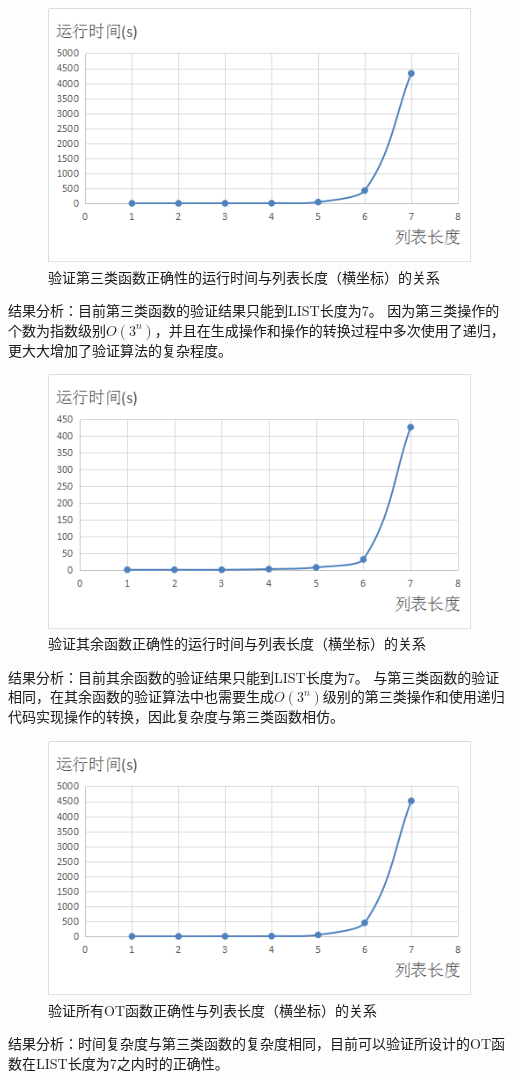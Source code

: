 \begin{figure}[H]
\centering
\includegraphics{figures/runtime3.bmp}
\caption{验证第三类函数正确性的运行时间与列表长度（横坐标）的关系}
\end{figure}
\par 结果分析：目前第三类函数的验证结果只能到LIST长度为7。
因为第三类操作的个数为指数级别$O(3^n)$，并且在生成操作和操作的转换过程中多次使用了递归，更大大增加了验证算法的复杂程度。

\begin{figure}[H]
\centering
\includegraphics{figures/runtime4.bmp}
\caption{验证其余函数正确性的运行时间与列表长度（横坐标）的关系}
\end{figure}
\par 结果分析：目前其余函数的验证结果只能到LIST长度为7。
与第三类函数的验证相同，在其余函数的验证算法中也需要生成$O(3^n)$级别的第三类操作和使用递归代码实现操作的转换，因此复杂度与第三类函数相仿。

\begin{figure}[H]
\centering
\includegraphics{figures/runtimeall.bmp}
\caption{验证所有OT函数正确性与列表长度（横坐标）的关系}
\end{figure}
\par 结果分析：时间复杂度与第三类函数的复杂度相同，目前可以验证所设计的OT函数在LIST长度为7之内时的正确性。
